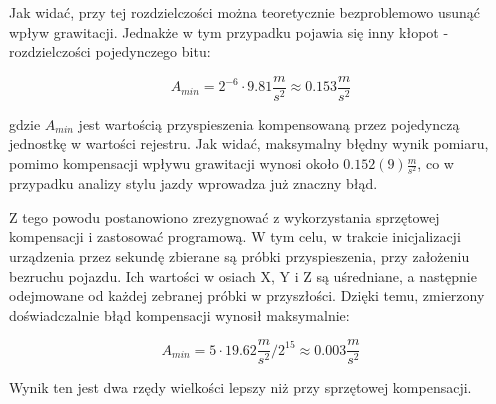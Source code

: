 Jak widać, przy tej rozdzielczości można teoretycznie bezproblemowo usunąć wpływ grawitacji. Jednakże w tym przypadku pojawia się inny kłopot - rozdzielczości pojedynczego bitu:

\begin{equation}
A_{min} = 2^{-6} \cdot 9.81\frac{m}{s^2} \approx 0.153 \frac{m}{s^2}
\end{equation}

gdzie $A_{min}$ jest wartością przyspieszenia kompensowaną przez pojedynczą jednostkę w wartości rejestru. Jak widać, maksymalny błędny wynik pomiaru, pomimo kompensacji wpływu grawitacji wynosi około $0.152(9) \frac{m}{s^2}$, co w przypadku analizy stylu jazdy wprowadza już znaczny błąd. 

Z tego powodu postanowiono zrezygnować z wykorzystania sprzętowej kompensacji i zastosować programową. W tym celu, w trakcie inicjalizacji urządzenia przez sekundę zbierane są próbki przyspieszenia, przy założeniu bezruchu pojazdu. Ich wartości w osiach X, Y i Z są uśredniane, a następnie odejmowane od każdej zebranej próbki w przyszłości. Dzięki temu, zmierzony doświadczalnie błąd kompensacji wynosił maksymalnie:

 \begin{equation}
A_{min} = 5 \cdot 19.62\frac{m}{s^2}/2^15 \approx 0.003 \frac{m}{s^2}
\end{equation}

Wynik ten jest dwa rzędy wielkości lepszy niż przy sprzętowej kompensacji.